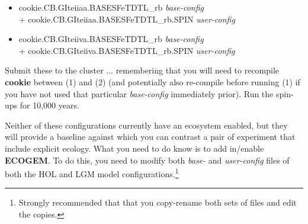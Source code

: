 \vspace{1mm}
\begin{itemize}[noitemsep]
\item[(1)] \textsf{\footnotesize cookie.CB.GIteiiaa.BASESFeTDTL\_rb } \textit{base-config} \\+ \textsf{\footnotesize cookie.CB.GIteiiaa.BASESFeTDTL\_rb.SPIN } \textit{user-config}
\item[(2)] \textsf{\footnotesize cookie.CB.GIteiiva.BASESFeTDTL\_rb } \textit{base-config} \\+ \textsf{\footnotesize cookie.CB.GIteiiva.BASESFeTDTL\_rb.SPIN } \textit{user-config}
\end{itemize}
\vspace{1mm}

\noindent Submit these to the cluster ...  remembering that you will need to recompile \textbf{cookie} between (1) and (2) (and potentially also re-compile before running (1) if you have not  used that particular \textit{base-config} immediately prior). Run the spin-ups for 10,000 years.

Neither of these configurations currently have an ecosystem enabled, but they will provide a baseline against which you can  contrast a pair of experiment that include explicit ecology. What you need to do know is to add in/enable \textbf{ECOGEM}. To do this, you need to modify both \textit{base-} and \textit{user-config} files of both the HOL and LGM model configurations.\footnote{Strongly recommended that that you copy-rename both sets of files and edit the copies.}

